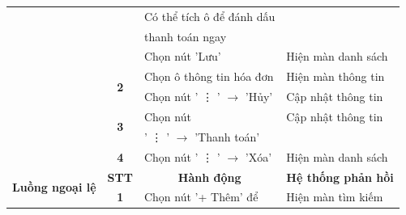 \documentclass[../DoAn.tex]{subfiles}
\begin{document}
\begin{table}[H]
\begin{tabular}{|l|c|l|l|}
                                                 &                                                                         & Có thể tích ô để đánh dấu                 &                                                 \\
                                                 &                                                                         & thanh toán ngay                           &                                                 \\
                                                 &                                                                         & Chọn nút 'Lưu'                            & Hiện màn danh sách                              \\ \cline{2-4}
                                                 & \multirow{2}{*}{\textbf{2}}                                             & Chọn ô thông tin hóa đơn                  & Hiện màn thông tin                              \\ \cline{3-4}
                                                 &                                                                         & Chọn nút ' \vdots{} ' $\rightarrow$ 'Hủy' & Cập nhật thông tin                              \\ \cline{2-4}
                                                 & \multirow{2}{*}{\textbf{3}}                                             & Chọn nút                                  & Cập nhật thông tin                              \\
                                                 &                                                                         & ' \vdots{} ' $\rightarrow$ 'Thanh toán'   &                                                 \\ \cline{2-4}
                                                 & \multirow{1}{*}{\textbf{4}}                                             & Chọn nút ' \vdots{} ' $\rightarrow$ 'Xóa' & Hiện màn danh sách                              \\ \hline
        \multirow{7}{*}{\textbf{Luồng ngoại lệ}} & \multicolumn{1}{c|}{\textbf{STT}}                                       & \multicolumn{1}{c|}{\textbf{Hành động}}   & \multicolumn{1}{c|}{\textbf{Hệ thống phản hồi}} \\ \cline{2-4}
                                                 & \multirow{6}{*}{\textbf{1}}                                             & Chọn nút '+ Thêm' để                      & Hiện màn tìm kiếm                               \\

\end{tabular}
\end{table}
\end{document}
